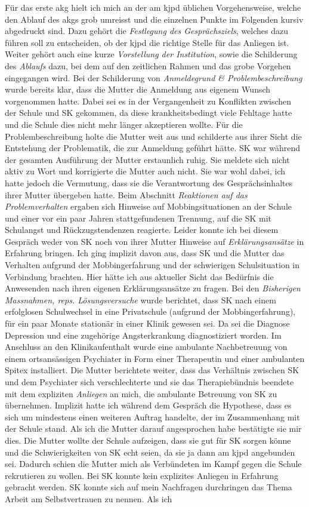 Für das erste \ac{akg} hielt ich mich an der am \ac{kjpd} üblichen Vorgehensweise, welche den Ablauf des \acp{akg} grob umreisst und die einzelnen Punkte im Folgenden kursiv abgedruckt sind. Dazu gehört die \textit{Festlegung des Gesprächsziels}, welches dazu führen soll zu entscheiden, ob der \ac{kjpd} die richtige Stelle für das Anliegen ist. Weiter gehört auch eine kurze \textit{Vorstellung der Institution}, sowie die Schilderung des \textit{Ablaufs} dazu, bei dem auf den zeitlichen Rahmen und das grobe Vorgehen eingegangen wird. Bei der Schilderung von \textit{Anmeldegrund \& Problembeschreibung} wurde bereits klar, dass die Mutter die Anmeldung aus eigenem Wunsch vorgenommen hatte. Dabei sei es in der Vergangenheit zu Konflikten zwischen der Schule und SK gekommen, da diese krankheitsbedingt viele Fehltage hatte und die Schule dies nicht mehr länger akzeptieren wollte. Für die Problembeschreibung holte die Mutter weit aus und schilderte aus ihrer Sicht die Entstehung der Problematik, die zur Anmeldung geführt hätte. SK war während der gesamten Ausführung der Mutter erstaunlich ruhig. Sie meldete sich nicht aktiv zu Wort und korrigierte die Mutter auch nicht. Sie war wohl dabei, ich hatte jedoch die Vermutung, dass sie die Verantwortung des Gesprächsinhaltes ihrer Mutter übergeben hatte. Beim Abschnitt \textit{Reaktionen auf das Problemverhalten} ergaben sich Hinweise auf Mobbingsituationen an der Schule und einer vor ein paar Jahren stattgefundenen Trennung, auf die SK mit Schulangst und Rückzugstendenzen reagierte. Leider konnte ich bei diesem Gespräch weder von SK noch von ihrer Mutter Hinweise auf \textit{Erklärungsansätze} in Erfahrung bringen. Ich ging implizit davon aus, dass SK und die Mutter das Verhalten aufgrund der Mobbingerfahrung und der schwierigen Schulsituation in Verbindung brachten. Hier hätte ich aus aktueller Sicht das Bedürfnis die Anwesenden nach ihren eigenen Erklärungsansätze zu fragen. Bei den \textit{Bisherigen Massnahmen, reps. Lösungsversuche} wurde berichtet, dass SK nach einem erfolglosen Schulwechsel in eine Privatschule (aufgrund der Mobbingerfahrung), für ein paar Monate stationär in einer Klinik gewesen sei. Da sei die Diagnose Depression und eine zugehörige Angsterkrankung diagnostiziert worden. Im Anschluss an den Klinikaufenthalt wurde eine ambulante Nachbetreuung von einem ortsansässigen Psychiater in Form einer Therapeutin und einer ambulanten Spitex installiert. Die Mutter berichtete weiter, dass das Verhältnis zwischen SK und dem Psychiater sich verschlechterte und sie das Therapiebündnis beendete mit dem expliziten \textit{Anliegen} an mich, die ambulante Betreuung von SK zu übernehmen. Implizit hatte ich während dem Gespräch die Hypothese, dass es sich um mindestens einen weiteren Auftrag handelte, der im Zusammenhang mit der Schule stand. Als ich die Mutter darauf angesprochen habe bestätigte sie mir dies. Die Mutter wollte der Schule aufzeigen, dass sie gut für SK sorgen könne und die Schwierigkeiten von SK echt seien, da sie ja dann am \ac{kjpd} angebunden sei. Dadurch schien die Mutter mich als Verbündeten im Kampf gegen die Schule rekrutieren zu wollen. Bei SK konnte kein explizites Anliegen in Erfahrung gebracht werden. SK konnte sich auf mein Nachfragen durchringen das Thema Arbeit am Selbstvertrauen zu nennen. Als ich 